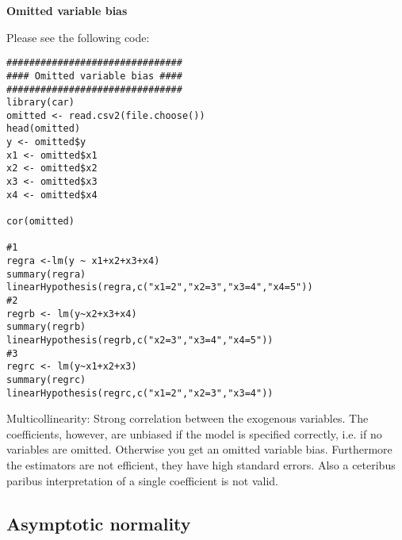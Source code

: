 \documentclass{article}
\begin{document}
\begin{solution}
\textbf{Omitted variable bias}

Please see the following code:
\begin{verbatim}
###############################
#### Omitted variable bias ####
###############################
library(car)
omitted <- read.csv2(file.choose())
head(omitted)
y <- omitted$y
x1 <- omitted$x1
x2 <- omitted$x2
x3 <- omitted$x3
x4 <- omitted$x4

cor(omitted)

#1
regra <-lm(y ~ x1+x2+x3+x4)
summary(regra)
linearHypothesis(regra,c("x1=2","x2=3","x3=4","x4=5"))
#2
regrb <- lm(y~x2+x3+x4)
summary(regrb)
linearHypothesis(regrb,c("x2=3","x3=4","x4=5"))
#3
regrc <- lm(y~x1+x2+x3)
summary(regrc)
linearHypothesis(regrc,c("x1=2","x2=3","x3=4"))
\end{verbatim}

Multicollinearity: Strong correlation between the exogenous
      variables. The coefficients, however, are unbiased if the model is
      specified correctly, i.e. if no variables are omitted. Otherwise you get an omitted variable bias.
      Furthermore the estimators are not efficient, they have high standard errors. Also a ceteribus
      paribus interpretation of a single coefficient is not valid.
\end{solution}

\subsection{Asymptotic normality}
\end{document}
